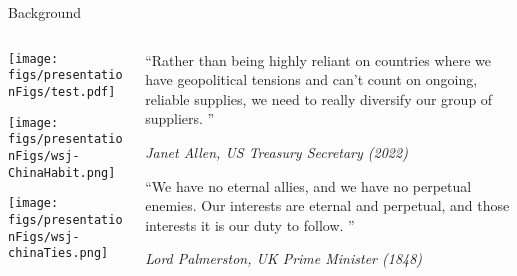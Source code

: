 \documentclass[10pt,xcolor={dvipsnames}]{beamer}
\begin{document}
\begin{frame}[plain]{Background}
\begin{columns}[T] %
    \begin{column}{.48\textwidth}
                \vspace{-0.cm}
                \texttt{[image: figs/presentationFigs/test.pdf]} \par
                \vspace{10pt}
                \texttt{[image: figs/presentationFigs/wsj-ChinaHabit.png]}\par
                \vspace{10pt}
                \texttt{[image: figs/presentationFigs/wsj-chinaTies.png]}
    \end{column}%
    \pause
    \hfill
    \begin{column}{.48\textwidth}
        \vspace{0.25in}
        \footnotesize ``Rather than being highly reliant on countries
                        where we have geopolitical tensions and can’t count on ongoing, reliable supplies, we need to really diversify our group of suppliers. '' \par
        \small \textit{  Janet Allen, US Treasury Secretary (2022)} \par 
        \vspace{0.25in}
        \footnotesize ``We have no eternal allies, and we have no                         perpetual enemies. Our interests are eternal and                  perpetual, and those interests it is our duty to follow. '' \par
        \small \textit{Lord Palmerston, UK Prime Minister  (1848)}
    \end{column}%
\end{columns}
\end{frame}
\end{document}
